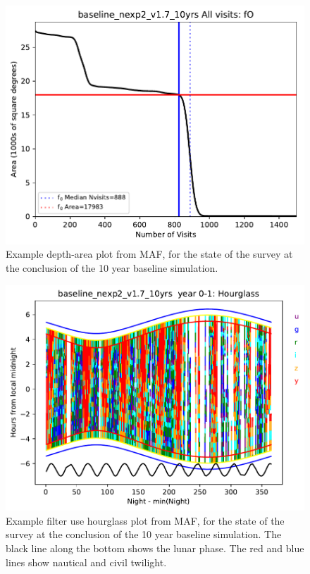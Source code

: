 \begin{figure}[htbp]
\centering
\includegraphics[height=0.4\textheight]{./figures/baseline_nexp2_v1_7_10yrs_fO_All_visits_HEAL_FO.pdf}
\caption{\label{fig:orge6e9a00}Example depth-area plot from MAF, for the state of the survey at the conclusion of the 10 year baseline simulation.}
\end{figure}


\begin{figure}[htbp]
\centering
\includegraphics[height=0.4\textheight]{./figures/baseline_nexp2_v1_7_10yrs_Hourglass_year_0-1_HOUR_Hourglass.pdf}
\caption{\label{fig:org449bf9c}Example filter use hourglass plot from MAF, for the state of the survey at the conclusion of the 10 year baseline simulation. The black line along the bottom shows the lunar phase. The red and blue lines show nautical and civil twilight.}
\end{figure}


